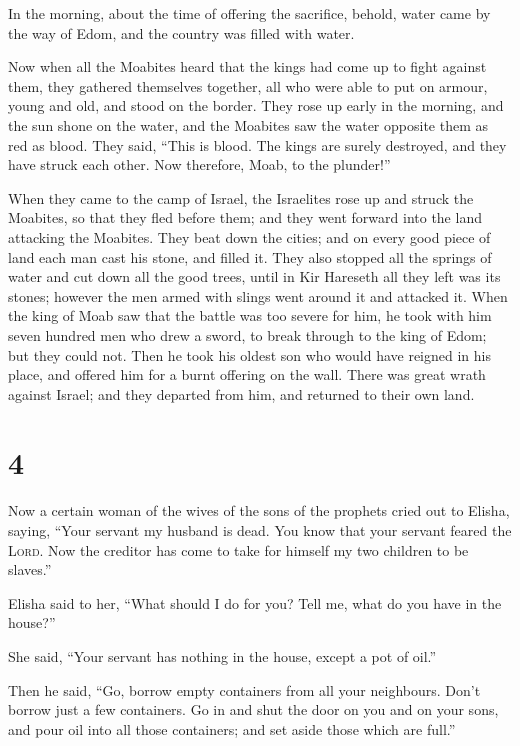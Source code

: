  In the morning, about the time of offering the
sacrifice, behold, water came by the way of Edom, and the country was
filled with water.

 Now when all the Moabites heard that the kings had come
up to fight against them, they gathered themselves together, all who
were able to put on armour, young and old, and stood on the border.
 They rose up early in the morning, and the sun shone on
the water, and the Moabites saw the water opposite them as red as blood.
 They said, ``This is blood. The kings are surely
destroyed, and they have struck each other. Now therefore, Moab, to the
plunder!''

 When they came to the camp of Israel, the Israelites
rose up and struck the Moabites, so that they fled before them; and they
went forward into the land attacking the Moabites.  They
beat down the cities; and on every good piece of land each man cast his
stone, and filled it. They also stopped all the springs of water and cut
down all the good trees, until in Kir Hareseth all they left was its
stones; however the men armed with slings went around it and attacked
it.  When the king of Moab saw that the battle was too
severe for him, he took with him seven hundred men who drew a sword, to
break through to the king of Edom; but they could not. 
Then he took his oldest son who would have reigned in his place, and
offered him for a burnt offering on the wall. There was great wrath
against Israel; and they departed from him, and returned to their own
land.

\hypertarget{section-3}{%
\section{4}\label{section-3}}

 Now a certain woman of the wives of the sons of the
prophets cried out to Elisha, saying, ``Your servant my husband is dead.
You know that your servant feared the \textsc{Lord}. Now the creditor
has come to take for himself my two children to be slaves.''

 Elisha said to her, ``What should I do for you? Tell me,
what do you have in the house?''

She said, ``Your servant has nothing in the house, except a pot of
oil.''

 Then he said, ``Go, borrow empty containers from all your
neighbours. Don't borrow just a few containers.  Go in and
shut the door on you and on your sons, and pour oil into all those
containers; and set aside those which are full.''

